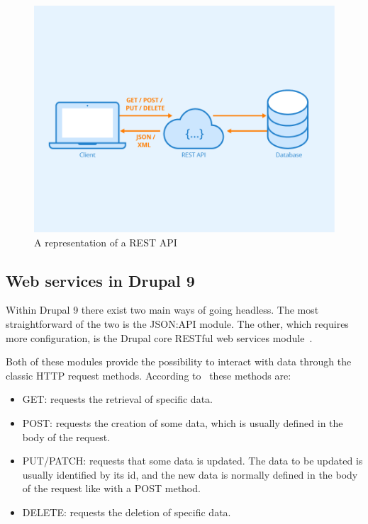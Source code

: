 \begin{figure}
	\centering
	\includegraphics{./img/Rest-API.png}
	\caption[REST API]{A representation of a REST API ~\autocite{Seobility}}
\end{figure}


\subsection{Web services in Drupal 9}
Within Drupal 9 there exist two main ways of going headless. The most straightforward of the two is the JSON:API module. The other, which requires more configuration, is the Drupal core RESTful web services module~\autocite{Drupal2018}. 

Both of these modules provide the possibility to interact with data through the classic HTTP request methods. According to~\autocite{Wilde2011} these methods are: 

\begin{itemize}
	\item GET: requests the retrieval of specific data.
	\item POST: requests the creation of some data, which is usually defined in the body of the request.
	\item PUT/PATCH: requests that some data is updated. The data to be updated is usually identified by its id, and the new data is normally defined in the body of the request like with a POST method.
	\item DELETE: requests the deletion of specific data.
\end{itemize}

